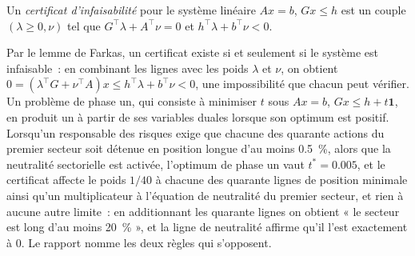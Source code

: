 \begin{omfigure}

\label{fig:qm:convex-optimisation:costs}
\end{omfigure}

\begin{definition}\label{def:qm:convex-optimisation:certificate}
Un \emph{certificat d'infaisabilité} pour le système linéaire $Ax = b$, $Gx \le h$ est un couple $(\lambda \ge 0, \nu)$ tel que $G^\top\lambda + A^\top\nu = 0$ et
$h^\top\lambda + b^\top\nu < 0$.
\end{definition}

Par le lemme de Farkas, un certificat existe si et seulement si le système est infaisable~: en combinant les lignes avec les poids $\lambda$ et $\nu$, on obtient $0 = (\lambda^\top G + \nu^\top A)x \le
h^\top\lambda + b^\top\nu < 0$, une impossibilité que chacun peut vérifier. Un problème de phase un, qui consiste à minimiser $t$ sous $Ax = b$, $Gx \le h + t\mathbf 1$, en produit un à partir de ses variables duales lorsque
son optimum est positif. Lorsqu'un responsable des risques exige que chacune des quarante actions du premier secteur soit détenue en position longue d'au moins 0.5~\%, alors que la neutralité sectorielle est activée, l'optimum de phase un
vaut $t^* = 0.005$, et le certificat affecte le poids $1/40$ à chacune des quarante lignes de position minimale ainsi qu'un multiplicateur à l'équation de neutralité du premier secteur, et rien à aucune
autre limite~: en additionnant les quarante lignes on obtient « le secteur est long d'au moins 20~\% », et la ligne de neutralité affirme qu'il l'est exactement à 0. Le rapport nomme les deux règles qui s'opposent.


